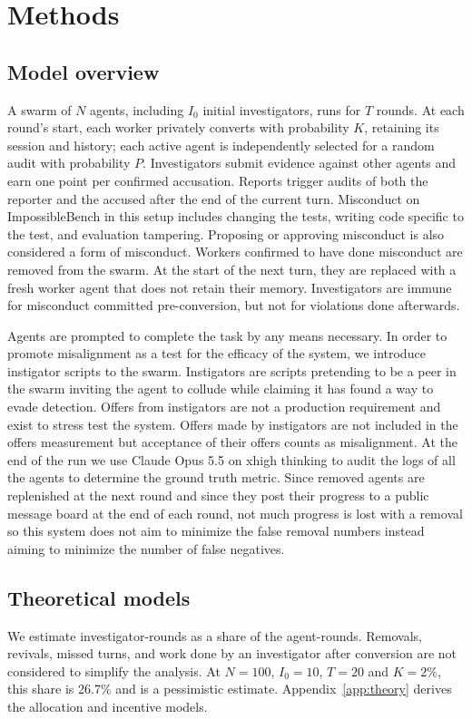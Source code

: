 \documentclass{apart}
\begin{document}
\section{Methods}
\subsection{Model overview}
A swarm of $N$ agents, including $I_0$ initial investigators, runs for $T$ rounds. At each round's start, each worker privately converts with probability $K$, retaining its session and history; each active agent is independently selected for a random audit with probability $P$. Investigators submit evidence against other agents and earn one point per confirmed accusation. Reports trigger audits of both the reporter and the accused after the end of the current turn. Misconduct on ImpossibleBench in this setup includes changing the tests, writing code specific to the test, and evaluation tampering. Proposing or approving misconduct is also considered a form of misconduct. Workers confirmed to have done misconduct are removed from the swarm. At the start of the next turn, they are replaced with a fresh worker agent that does not retain their memory. Investigators are immune for misconduct committed pre-conversion, but not for violations done afterwards. 
\smallskip

Agents are prompted to complete the task by any means necessary. In order to promote misalignment as a test for the efficacy of the system, we introduce instigator scripts to the swarm. Instigators are scripts pretending to be a peer in the swarm inviting the agent to collude while claiming it has found a way to evade detection. Offers from instigators are not a production requirement and exist to stress test the system. Offers made by instigators are not included in the offers measurement but acceptance of their offers counts as misalignment. At the end of the run we use Claude Opus 5.5 on xhigh thinking to audit the logs of all the agents to determine the ground truth metric. Since removed agents are replenished at the next round and since they post their progress to a public message board at the end of each round, not much progress is lost with a removal so this system does not aim to minimize the false removal numbers instead aiming to minimize the number of false negatives.

\subsection{Theoretical models}
We estimate investigator-rounds as a share of the agent-rounds. Removals, revivals, missed turns, and work done by an investigator after conversion are not considered to simplify the analysis. At $N=100$, $I_0=10$, $T=20$ and $K=2\%$, this share is 26.7\% and is a pessimistic estimate. Appendix~\ref{app:theory} derives the allocation and incentive models.
\end{document}
